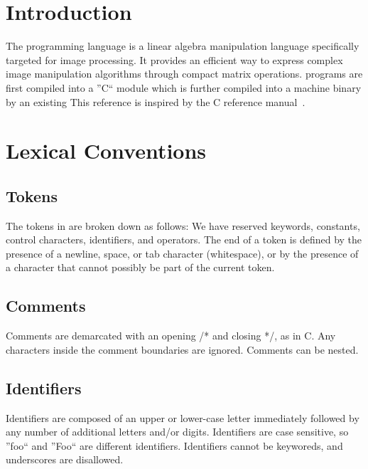 \newcommand{\startsyn}{\begin{center}\begin{tabular}{l}}
\newcommand{\stopsyn}{\end{tabular}\end{center}}

\section{Introduction}
The \sys{} programming language is a linear algebra manipulation language
specifically targeted for image processing. It provides an efficient way to
express complex image manipulation algorithms through compact matrix
operations. \sys{} programs are first compiled into a ''C`` module which is
further compiled into a machine binary by an existing 
This reference is inspired by the C reference manual~\cite{DBLP:books/ph/KernighanR88}.

\section{Lexical Conventions}
\label{sec:lex}

\subsection{Tokens}
\label{ssec:tokens}
The tokens in \sys{} are broken down as follows: We have reserved
keywords, constants, control characters, identifiers, and operators.
The end of a token is defined by the presence of a newline, space,
or tab character (whitespace), or by the presence of a character that
cannot possibly be part of the current token.

\subsection{Comments}
\label{ssec:comments}
Comments are demarcated with an opening /* and closing */, as in C.
Any characters inside the comment boundaries are ignored. Comments
can be nested.

\subsection{Identifiers}
\label{ssec:identifiers}
Identifiers are composed of an upper or lower-case letter immediately
followed by any number of additional letters and/or digits. Identifiers
are case sensitive, so ''foo`` and ''Foo`` are different identifiers.
Identifiers cannot be keyworeds, and underscores are disallowed.

